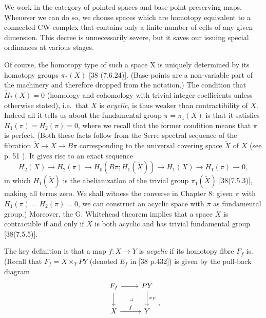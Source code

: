 \documentclass[openany,leqno]{book}  %
\begin{document}
We work in the category of pointed spaces and base-point preserving maps. Whenever we can do so, we choose spaces which are homotopy equivalent to a connected CW-complex that contains only a finite number of cells of any given dimension. This decree is unnecessarily severe, but it saves our issuing special ordinances at various stages.

Of course, the homotopy type of such a space X is uniquely determined by its homotopy groups $\pi_*(X)$ [38 (7.6.24)]. (Base-points are a non-variable part of the machinery and therefore dropped from the notation.) The condition that $\widetilde{H}_*(X) = 0$ (homology and cohomology with trivial integer coefficients unless otherwise stated), i.e.\  that $X$ is {\em acyclic}, is thus weaker than contractibility of $X$. Indeed all it tells us about the fundamental group $\pi =\pi_1(X)$ is that it satisfies $H_1(\pi) = H_2(\pi) = 0$, where we recall that the former condition means that $\pi$ is perfect. (Both these facts follow from the Serre spectral sequence of the fibration $\widetilde{X} \longrightarrow X \longrightarrow B\pi$ corresponding to the universal covering space $\widetilde{X}$ of $X$ (see p. 51 ). It gives rise to an exact sequence
\[H_2(X)\longrightarrow H_2(\pi) \longrightarrow H_0(B\pi; H_1(\widetilde{X}))\longrightarrow H_1(X)\longrightarrow H_1(\pi) \longrightarrow 0,\]
in which $H_1(\widetilde{X})$ is the abelianizatlon of the trivial group $\pi_1(\widetilde{X})$ [38(7.5.3)], making all terms zero. We shall witness the converse in Chapter 8: given $\pi$ with $H_1(\pi) = H_2(\pi) = 0$, we can construct an acyclic space with $\pi$ as fundamental group.) Moreover, the G. Whitehead theorem implies that a space $X$ is contractible if and only if $X$ is both acyclic and has trivial fundamental group [38(7.5.5)].

The key definition is that a map $f\colon   X \longrightarrow Y$ is {\em acyclic} if its homotopy fibre $F_f$ is. (Recall that $F_f = X \times_Y PY$ (denoted $E_f$ in [38 p.432]) is given by the pull-back diagram
\[\begin{tikzcd}
F_f \arrow{r} \arrow{d} \arrow[dr, phantom, "\lrcorner"]& PY \arrow{d}{\pi_Y}\\
X \arrow{r}{f} & Y \\
\end{tikzcd},\]
\end{document}
